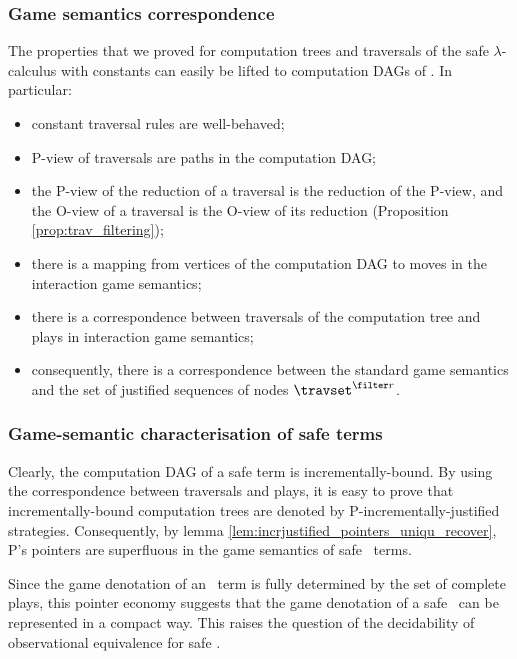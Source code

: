 \subsubsection{Game semantics correspondence}
The properties that we proved for computation trees and traversals
of the safe $\lambda$-calculus with constants can easily be lifted
to computation DAGs of \ialgol. In particular:
\begin{itemize}
\item constant traversal rules are well-behaved;
\item P-view of traversals are paths in the computation DAG;
\item the P-view of the reduction of a traversal is the reduction of the P-view,
and the O-view of a traversal is the O-view of its reduction
(Proposition \ref{prop:trav_filtering});
\item there is a mapping from vertices of the computation DAG to moves in the interaction game semantics;
\item there is a correspondence between traversals of the computation tree and plays in interaction game semantics;
\item consequently, there is a correspondence between the standard game semantics and
the set of justified sequences of nodes $\travset^{\filter r}$.
\end{itemize}

\subsubsection{Game-semantic characterisation of safe terms}
Clearly, the computation DAG of a safe term is incrementally-bound.
By using the correspondence between traversals and plays, it is easy
to prove that incrementally-bound computation trees are denoted by
P-incrementally-justified strategies. Consequently, by lemma
\ref{lem:incrjustified_pointers_uniqu_recover}, P's pointers are superfluous in the
game semantics of safe \ialgol\ terms.

Since the game denotation of an \ialgol\ term is fully determined by
the set of complete plays, this pointer economy suggests that the
game denotation of a safe \ialgol\ can be represented in a compact
way. This raises the question of the decidability of observational
equivalence for safe \ialgol.
